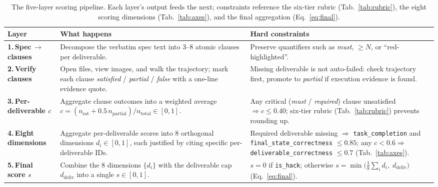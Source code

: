 \begin{table}[!htbp]
\centering
\footnotesize
\setlength{\tabcolsep}{6pt}
\renewcommand{\arraystretch}{1.35}
\begin{tabular}{@{}>{\bfseries}l >{\raggedright\arraybackslash}p{6.0cm} >{\raggedright\arraybackslash}p{6.4cm}@{}}
\toprule
\textbf{Layer} & \textbf{What happens} & \textbf{Hard constraints} \\
\midrule
1.\,Spec$\,\to\,$clauses
  & Decompose the verbatim spec text into 3--8 atomic clauses per deliverable.
  & Preserve quantifiers such as \emph{must}, $\geq N$, or ``red-highlighted''. \\
2.\,Verify clauses
  & Open files, view images, and walk the trajectory; mark each clause \emph{satisfied} / \emph{partial} / \emph{false} with a one-line evidence quote.
  & Missing deliverable is not auto-failed: check trajectory first, promote to \emph{partial} if execution evidence is found. \\
3.\,Per-deliverable $c$
  & Aggregate clause outcomes into a weighted average $c = (n_{\text{sat}} + 0.5\,n_{\text{partial}}) / n_{\text{total}} \in [0,1]$.
  & Any critical (\emph{must} / \emph{required}) clause unsatisfied $\Rightarrow c \leq 0.40$; six-tier rubric (Tab.~\ref{tab:rubric}) prevents rounding up. \\
4.\,Eight dimensions
  & Aggregate per-deliverable scores into 8 orthogonal dimensions $d_i \in [0,1]$, each justified by citing specific per-deliverable IDs.
  & Required deliverable missing $\Rightarrow$ \texttt{task\_completion} and \texttt{final\_state\_correctness} $\leq 0.85$; any $c < 0.6 \Rightarrow$ \texttt{deliverable\_correctness} $\leq 0.7$ (Tab.~\ref{tab:axes}). \\
5.\,Final score $s$
  & Combine the 8 dimensions $\{d_i\}$ with the deliverable cap $d_{\text{deliv}}$ into a single $s \in [0,1]$.
  & $s = 0$ if \texttt{is\_hack}; otherwise $s = \min\!\big(\tfrac{1}{8}\sum_i d_i,\; d_{\text{deliv}}\big)$ (Eq.~\ref{eq:final}). \\
\bottomrule
\end{tabular}
\caption{The five-layer scoring pipeline. Each layer's output feeds the next; constraints reference the six-tier rubric (Tab.~\ref{tab:rubric}), the eight scoring dimensions (Tab.~\ref{tab:axes}), and the final aggregation (Eq.~\ref{eq:final}).}
\label{tab:layers}
\end{table}

